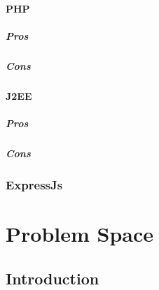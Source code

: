 \documentclass[11pt, openany]{report}
\begin{document}
      \subsubsection{PHP}
        \paragraph{Pros}
        \paragraph{Cons}

      \subsubsection{J2EE}

        \paragraph{Pros}
        \paragraph{Cons}

    \subsection{ ExpressJs }
\chapter{Problem Space}
  \section*{Introduction}

\clearpage
\end{document}
